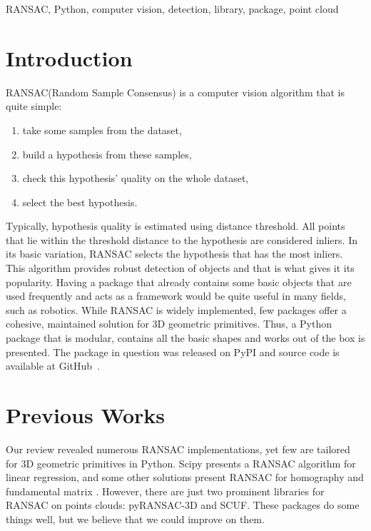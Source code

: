 \documentclass[10pt,conference,a4paper]{IEEEtran_EDM}
\begin{document}
\begin{IEEEkeywords}
RANSAC, Python, computer vision, detection, library, package, point cloud
\end{IEEEkeywords}

\section{Introduction}
RANSAC(Random Sample Consensus) is a computer vision algorithm that is quite simple: 
\begin{enumerate}
    \item take some samples from the dataset,
    \item build a hypothesis from these samples,
    \item check this hypothesis' quality on the whole dataset,
    \item select the best hypothesis.
\end{enumerate}
Typically, hypothesis quality is estimated using distance threshold. All points
that lie within the threshold distance to the hypothesis are considered
inliers. In its basic variation, RANSAC selects the hypothesis that has the
most inliers.
This algorithm provides robust detection of objects and that is what
gives it its popularity. Having a package that already contains some basic
objects that are used frequently and acts as a framework would be quite useful
in many fields, such as robotics. 
While RANSAC is widely implemented, few packages offer a cohesive, maintained
solution for 3D geometric primitives. Thus, a Python package that is modular,
contains all the basic shapes and works out of the box is presented. The
package in question was released on PyPI and source code is available at
GitHub~\cite{skorobogatov2026starkit}.

\section{Previous Works}
Our review revealed numerous RANSAC implementations, yet few are tailored for
3D geometric primitives in Python. Scipy\cite{2020SciPy-NMeth} presents a
RANSAC algorithm for linear regression, and some other solutions present RANSAC
for homography and fundamental matrix \cite{Mishkin2015MODS}. However, there
are just two prominent libraries for RANSAC on points clouds:
pyRANSAC-3D\cite{Mariga_pyRANSAC-3D_2022} and SCUF\cite{SCUF}. These packages
do some things well, but we believe that we could improve on them.
\end{document}
